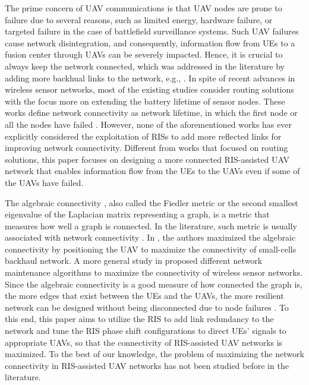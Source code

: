 \documentclass[conference]{IEEEtran}
\begin{document}
The prime concern of UAV communications is that UAV nodes  are prone to failure due to several reasons, such as limited energy, hardware failure, or targeted failure in the case of battlefield surveillance systems. Such UAV failures cause  network disintegration, and consequently, information flow from UEs to a fusion center through UAVs can be severely impacted. Hence, it is crucial to always keep the  network connected, which was addressed in the literature by adding more backhual links to the network, e.g., \cite{H}. In spite of recent advances in wireless sensor networks, most of the existing studies consider routing solutions with the focus more on extending the battery lifetime of sensor nodes. These works define network connectivity as network lifetime, in which the first node or all the nodes have failed \cite{1331424, 926982}.
However, none of the aforementioned works has ever explicitly considered the exploitation of RISs to add more reflected links for improving network connectivity. Different from works \cite{1331424, 926982} that focused on routing solutions, this paper focuses on designing a more connected RIS-assisted UAV network that enables information flow from the UEs to the UAVs even if some of the UAVs  have failed. %

The algebraic connectivity \cite{new}, also called  the Fiedler metric or the second smallest eigenvalue of the Laplacian matrix representing a graph, is a metric that measures how well a graph  is connected.  In the literature, such metric is usually associated with network connectivity \cite{8292633, 4657335, 4786516}. In \cite{8292633}, the authors maximized the algebraic connectivity by positioning the UAV to maximize the connectivity of small-cells backhaul network. A more general study in \cite{4657335} proposed different network maintenance algorithms to  maximize the connectivity of wireless sensor networks. Since the algebraic connectivity is a good measure of how connected the graph is, the more edges that exist between the UEs and the UAVs, the more resilient network can be designed without being disconnected due to node failures \cite{4657335, 4786516}. To this end, this paper aims to utilize the RIS to add link redundancy to the network and tune the RIS phase shift configurations to direct UEs' signals to appropriate UAVs, so that the connectivity of RIS-assisted UAV networks is maximized. To the best of our knowledge, the problem of maximizing the network connectivity in RIS-assisted UAV networks has not been studied before in the literature. 
\end{document}
